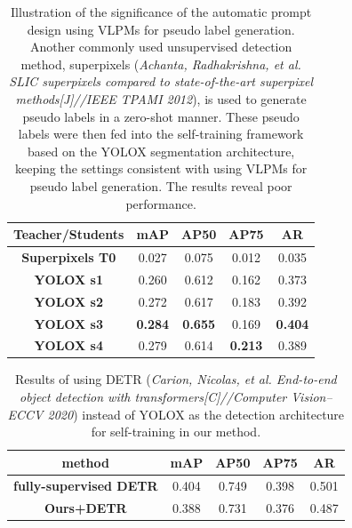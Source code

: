 \documentclass[runningheads]{llncs}
\begin{document}
\begin{table}[h]
\caption{Illustration of the significance of the automatic prompt design using VLPMs for pseudo label generation. Another commonly used unsupervised detection method, superpixels (\textit{Achanta, Radhakrishna, et al. SLIC superpixels compared to state-of-the-art superpixel methods[J]//IEEE TPAMI 2012}), is used to generate pseudo labels in a zero-shot manner. These pseudo labels were then fed into the self-training framework based on the YOLOX segmentation architecture, keeping the settings consistent with using VLPMs for pseudo label generation. The results reveal poor performance.}
\begin{center}
\begin{tabular}{c|cccc}
\hline
\textbf{Teacher/Students} & \textbf{mAP} & \textbf{AP50} & \textbf{AP75} & \textbf{AR} \\ \hline
\textbf{Superpixels T0} & 0.027 & 0.075 & 0.012 & 0.035 \\
\textbf{YOLOX s1} & 0.260 & 0.612 & 0.162 & 0.373 \\
\textbf{YOLOX s2} & 0.272 & 0.617 & 0.183 & 0.392 \\
\textbf{YOLOX s3} & \textbf{0.284} & \textbf{0.655} & 0.169 & \textbf{0.404} \\
\textbf{YOLOX s4} & 0.279 & 0.614 & \textbf{0.213} & 0.389 \\ \hline
\end{tabular}
\vskip -0.45in
\label{tab：superpixel}
\end{center}
\end{table}
\begin{table}[h]
\caption{Results of using DETR (\textit{Carion, Nicolas, et al. End-to-end object detection with transformers[C]//Computer Vision–ECCV 2020}) instead of YOLOX as the detection architecture for self-training in our method.}
\begin{center}
\begin{tabular}{c|cccc}
\hline
\textbf{method} & \textbf{mAP} & \textbf{AP50} & \textbf{AP75} & \textbf{AR} \\ \hline
\textbf{fully-supervised DETR} & 0.404 & 0.749 & 0.398 & 0.501 \\
\textbf{Ours+DETR} & 0.388 & 0.731 & 0.376 & 0.487 \\ \hline
\end{tabular}
\vskip -0.45in
\label{tab：detr}
\end{center}
\end{table}
\end{document}
